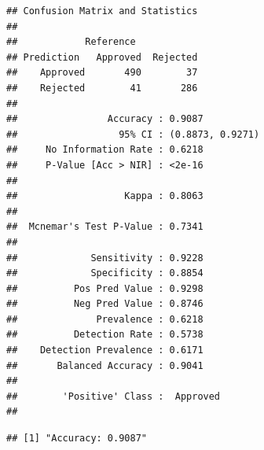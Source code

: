 \documentclass[
]{article}
\newenvironment{Shaded}{\begin{snugshade}}{\end{snugshade}}
\newcommand{\CommentTok}[1]{\textcolor[rgb]{0.56,0.35,0.01}{\textit{#1}}}
\newcommand{\DecValTok}[1]{\textcolor[rgb]{0.00,0.00,0.81}{#1}}
\newcommand{\FunctionTok}[1]{\textcolor[rgb]{0.13,0.29,0.53}{\textbf{#1}}}
\newcommand{\NormalTok}[1]{#1}
\newcommand{\OtherTok}[1]{\textcolor[rgb]{0.56,0.35,0.01}{#1}}
\newcommand{\SpecialCharTok}[1]{\textcolor[rgb]{0.81,0.36,0.00}{\textbf{#1}}}
\newcommand{\StringTok}[1]{\textcolor[rgb]{0.31,0.60,0.02}{#1}}
\begin{document}
\begin{verbatim}
## Confusion Matrix and Statistics
## 
##            Reference
## Prediction   Approved  Rejected
##    Approved       490        37
##    Rejected        41       286
##                                           
##                Accuracy : 0.9087          
##                  95% CI : (0.8873, 0.9271)
##     No Information Rate : 0.6218          
##     P-Value [Acc > NIR] : <2e-16          
##                                           
##                   Kappa : 0.8063          
##                                           
##  Mcnemar's Test P-Value : 0.7341          
##                                           
##             Sensitivity : 0.9228          
##             Specificity : 0.8854          
##          Pos Pred Value : 0.9298          
##          Neg Pred Value : 0.8746          
##              Prevalence : 0.6218          
##          Detection Rate : 0.5738          
##    Detection Prevalence : 0.6171          
##       Balanced Accuracy : 0.9041          
##                                           
##        'Positive' Class :  Approved       
## 
\end{verbatim}

\begin{Shaded}
\end{Shaded}

\begin{verbatim}
## [1] "Accuracy: 0.9087"
\end{verbatim}

\begin{Shaded}
\end{Shaded}
\end{document}

